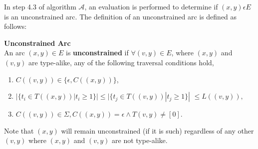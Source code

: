 In step 4.3 of algorithm ${\mathcal{A}}$, an evaluation is performed to determine if $(x,y) \epsilon E$ is an unconstrained arc. The definition of an unconstrained arc is defined as follows:
\begin{defn} \label{unconstrainedarc}
    \textbf{Unconstrained Arc} \cite{Malinao2017} \\
    An arc $(x, y) \in E$ is \textbf{unconstrained} if $\forall (v,y) \in E$, where $(x,y)$ and $(v,y)$ are type-alike, any of the following traversal conditions hold, 
    \begin{enumerate}
        \item $C((v,y)) \in \{\epsilon, C((x,y))\}$,
        \item { $|\{t_i \in T((x,y))|t_i \geq 1\}| \leq  |\{t_j \in T((v,y))|t_j \geq 1\}|$ $\leq L((v,y)),$}
        \item $C((v,y)) \in \Sigma, C((x,y)) = \epsilon \wedge T(v,y) \neq [0]$.
    \end{enumerate}
    Note that $(x,y)$ will remain unconstrained (if it is such) regardless of any other $(v,y)$ where $(x,y)$ and $(v,y)$ are not type-alike.
\end{defn}



